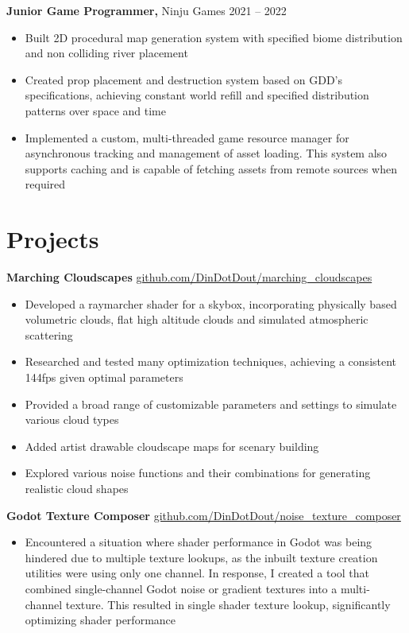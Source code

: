 \documentclass[10pt]{article}       %
\begin{document}
\textbf{Junior Game Programmer,}  {Ninju Games} \hfill 2021 -- 2022 \\
\vspace{-9pt}
\begin{itemize}
	\item Built 2D procedural map generation system with specified biome distribution and non colliding river placement
	\item Created prop placement and destruction system based on GDD's specifications, achieving constant world refill and specified distribution patterns over space and time
	\item Implemented a custom, multi-threaded game resource manager for asynchronous tracking and management of asset loading. This system also supports caching and is capable of fetching assets from remote sources when required
\end{itemize}

\vspace{-18.5pt}

\section*{Projects}
\textbf{Marching Cloudscapes} \hfill \href{https://github.com/DinDotDout/marching_cloudscapes}{github.com/DinDotDout/marching\_cloudscapes} \\
\vspace{-9pt}
\begin{itemize}
	\item Developed a raymarcher shader for a skybox, incorporating physically based volumetric clouds, flat high altitude clouds and simulated atmospheric scattering
	\item Researched and tested many optimization techniques, achieving a consistent 144fps given optimal parameters
	\item Provided a broad range of customizable parameters and settings to simulate various cloud types
	\item Added artist drawable cloudscape maps for scenary building
	\item Explored various noise functions and their combinations for generating realistic cloud shapes
\end{itemize}

\textbf{Godot Texture Composer} \hfill \href{https://github.com/DinDotDout/noise_texture_composer}{github.com/DinDotDout/noise\_texture\_composer} \\
\vspace{-9pt}
\begin{itemize}
	\item Encountered a situation where shader performance in Godot was being hindered due to multiple texture lookups, as the inbuilt texture creation utilities were using only one channel. In response, I created a tool that combined single-channel Godot noise or gradient textures into a multi-channel texture. This resulted in single shader texture lookup, significantly optimizing shader performance
\end{itemize}
\end{document}
